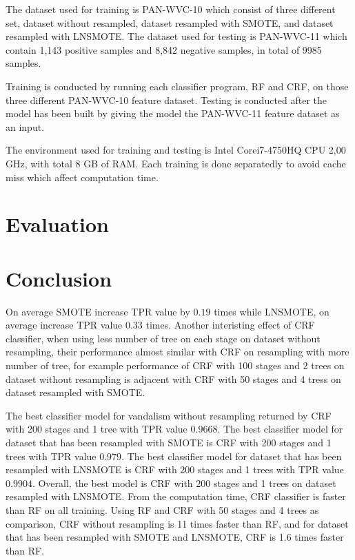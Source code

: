

The dataset used for training is PAN-WVC-10 which consist of three different
set, dataset without resampled, dataset resampled with SMOTE, and dataset
resampled with LNSMOTE.
The dataset used for testing is PAN-WVC-11 which contain 1,143 positive
samples and 8,842 negative samples, in total of 9985 samples.

Training is conducted by running each classifier program, RF and CRF, on
those three different PAN-WVC-10 feature dataset.
Testing is conducted after the model has been built by giving the model the
PAN-WVC-11 feature dataset as an input.

The environment used for training and testing is Intel\textregistered
Core\texttrademark i7-4750HQ CPU 2,00 GHz, with total 8 GB of RAM.
Each training is done separatedly to avoid cache miss which affect computation
time.


\section{Evaluation}
	\label{section:result_and_analysis}
	

\section{Conclusion}
\label{section:conclusion}

On average SMOTE increase TPR value by $0.19$ times while LNSMOTE, on average
increase TPR value $0.33$ times.
Another interisting effect of CRF classifier, when using less number of tree on
each stage on dataset without resampling, their performance almost similar with
CRF on resampling with more number of tree, for example performance of CRF with
100 stages and 2 trees on dataset without resampling is adjacent with CRF with
50 stages and 4 tress on dataset resampled with SMOTE.

The best classifier model for vandalism without resampling returned by CRF with
200 stages and 1 tree with TPR value $0.9668$.
The best classifier model for dataset that has been resampled with SMOTE is CRF
with 200 stages and 1 trees with TPR value $0.979$.
The best classifier model for dataset that has been resampled with LNSMOTE is
CRF with 200 stages and 1 trees with TPR value $0.9904$.
Overall, the best model is CRF with 200 stages and 1 trees on dataset resampled
with LNSMOTE.
From the computation time, CRF classifier is faster than RF on all training.
Using RF and CRF with 50 stages and 4 trees as comparison, CRF without
resampling is 11 times faster than RF, and for dataset that has been resampled
with SMOTE and LNSMOTE, CRF is 1.6 times faster than RF.

